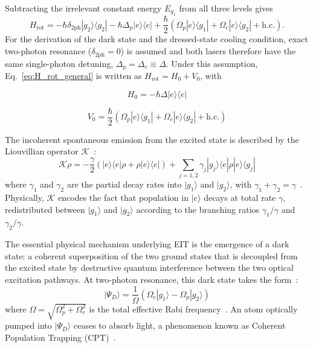 Subtracting the irrelevant constant energy $E_{g_1}$ from all three levels gives
\begin{equation}
    H_{\mathrm{rot}} = -\hbar\delta_{2\mathrm{ph}}|g_2\rangle\langle g_2| -\hbar\Delta_p|e\rangle\langle e|
    +\frac{\hbar}{2}\left(\Omega_p|e\rangle\langle g_1|+\Omega_c|e\rangle\langle g_2|+\mathrm{h.c.}\right).
    \label{eq:H_rot_general}
\end{equation}
For the derivation of the dark state and the dressed-state cooling condition, exact two-photon resonance ($\delta_{2\mathrm{ph}}=0$) is assumed and both lasers therefore have the same single-photon detuning, $\Delta_p=\Delta_c\equiv\Delta$. Under this assumption, Eq.~\eqref{eq:H_rot_general} is written as $H_{\mathrm{rot}}=H_0+V_0$, with~\cite{Morigi:03}

\begin{equation}
    H_0 = -\hbar\Delta |e\rangle\langle e|
    \label{eq:H0}
\end{equation}

\begin{equation}
    V_0 = \frac{\hbar}{2}\left(\Omega_p |e\rangle\langle g_1| + \Omega_c |e\rangle\langle g_2| + \text{h.c.}\right)
    \label{eq:V0}
\end{equation}

The incoherent spontaneous emission from the excited state is described by the Liouvillian operator $\mathcal{K}$~\cite{Morigi:03}:
\begin{equation}
    \mathcal{K}\rho = -\frac{\gamma}{2}\left(|e\rangle\langle e|\rho + \rho|e\rangle\langle e|\right) + \sum_{j=1,2} \gamma_j |g_j\rangle\langle e|\rho|e\rangle\langle g_j|
    \label{eq:liouvillian}
\end{equation}
where $\gamma_1$ and $\gamma_2$ are the partial decay rates into $|g_1\rangle$ and $|g_2\rangle$, with $\gamma_1 + \gamma_2 = \gamma$~\cite{Morigi:03}. Physically, $\mathcal{K}$ encodes the fact that population in $|e\rangle$ decays at total rate $\gamma$, redistributed between $|g_1\rangle$ and $|g_2\rangle$ according to the branching ratios $\gamma_1/\gamma$ and $\gamma_2/\gamma$.

The essential physical mechanism underlying EIT is the emergence of a dark state: a coherent superposition of the two ground states that is decoupled from the excited state by destructive quantum interference between the two optical excitation pathways. At two-photon resonance, this dark state takes the form~\cite{Morigi:03}:
\begin{equation}
    |\Psi_D\rangle = \frac{1}{\Omega}\left(\Omega_c |g_1\rangle - \Omega_p |g_2\rangle\right)
    \label{eq:darkstate}
\end{equation}
where $\Omega = \sqrt{\Omega_p^2 + \Omega_c^2}$ is the total effective Rabi frequency~\cite{Morigi:03}. An atom optically pumped into $|\Psi_D\rangle$ ceases to absorb light, a phenomenon known as Coherent Population Trapping (CPT)~\cite{Lounis:92}.

